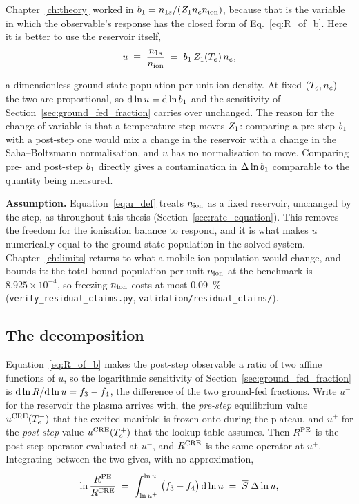 Chapter~\ref{ch:theory} worked in $b_1 = n_{1s}/(Z_{1}n_en_{\mathrm{ion}})$, because
that is the variable in which the observable's response has the closed form of
Eq.~\eqref{eq:R_of_b}. Here it is better to use the reservoir itself,
\begin{equation}
  u \;\equiv\; \frac{n_{1s}}{n_{\mathrm{ion}}} \;=\; b_1\,Z_{1}(T_e)\,n_e ,
  \label{eq:u_def}
\end{equation}

\noindent a dimensionless ground-state population per unit ion density. At
fixed $(T_e,n_e)$ the two are proportional, so $\mathrm{d}\ln u =
\mathrm{d}\ln b_1$ and the sensitivity of
Section~\ref{sec:ground_fed_fraction} carries over unchanged. The reason for
the change of variable is that a temperature step moves $Z_{1}$: comparing a
pre-step $b_1$ with a post-step one would mix a change in the reservoir with a
change in the Saha--Boltzmann normalisation, and $u$ has no normalisation to
move. Comparing pre- and post-step $b_1$ directly gives a contamination in
$\Delta\ln b_1$ comparable to the quantity being measured.

\textbf{Assumption.} Equation~\eqref{eq:u_def} treats $n_{\mathrm{ion}}$ as a fixed
reservoir, unchanged by the step, as throughout this thesis
(Section~\ref{sec:rate_equation}). This removes the freedom for the ionisation
balance to respond, and it is what makes $u$ numerically equal to the
ground-state population in the solved system. Chapter~\ref{ch:limits} returns to
what a mobile ion population would change, and bounds it: the total bound
population per unit $n_{\mathrm{ion}}$ at the benchmark is $8.925\times10^{-4}$, so
freezing $n_{\mathrm{ion}}$ costs at most \SI{0.09}{\percent}
(\texttt{verify\_residual\_claims.py}, \texttt{validation/residual\_claims/}).

\subsection{The decomposition}

Equation~\eqref{eq:R_of_b} makes the post-step observable a ratio of two affine
functions of $u$, so the logarithmic sensitivity of
Section~\ref{sec:ground_fed_fraction} is $\mathrm{d}\ln R/\mathrm{d}\ln u =
f_{3}-f_{4}$, the difference of the two ground-fed fractions.
Write $u^-$ for the reservoir the plasma arrives with, the
\emph{pre-step} equilibrium value $u^{\mathrm{CRE}}(T_e^-)$ that the excited
manifold is frozen onto during the plateau, and $u^+$ for the \emph{post-step}
value $u^{\mathrm{CRE}}(T_e^+)$ that the lookup table assumes. Then $R^{\mathrm{PE}}$ is the
post-step operator evaluated at $u^-$, and $R^{\mathrm{CRE}}$ is the same operator at
$u^+$. Integrating between the two gives, with no approximation,
\begin{equation}
  \ln\frac{R^{\mathrm{PE}}}{R^{\mathrm{CRE}}}
  \;=\; \int_{\ln u^+}^{\ln u^-}\!\!\big(f_{3}-f_{4}\big)\,\mathrm{d}\ln u
  \;=\; \overline{S}\;\Delta\ln u ,
  \label{eq:exact_decomposition}
\end{equation}

